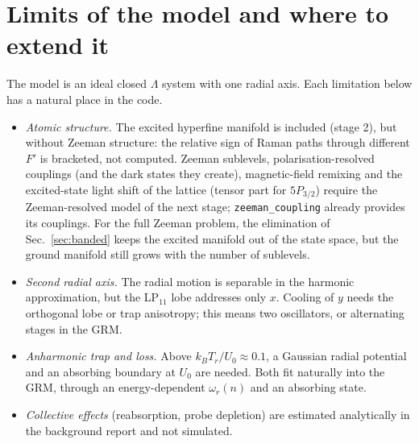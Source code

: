 \documentclass[11pt,a4paper]{article}
\newcommand{\code}[1]{\texttt{#1}}
\begin{document}
\section{Limits of the model and where to extend it}
The model is an ideal closed $\Lambda$ system with one radial axis. Each limitation below has a natural place in the code.
\begin{itemize}
\item \emph{Atomic structure.} The excited hyperfine manifold is included (stage 2), but without Zeeman structure: the relative sign of Raman paths through different $F'$ is bracketed, not computed. Zeeman sublevels, polarisation-resolved couplings (and the dark states they create), magnetic-field remixing and the excited-state light shift of the lattice (tensor part for $5P_{3/2}$) require the Zeeman-resolved model of the next stage; \code{zeeman\_coupling} already provides its couplings. For the full Zeeman problem, the elimination of Sec.~\ref{sec:banded} keeps the excited manifold out of the state space, but the ground manifold still grows with the number of sublevels.
\item \emph{Second radial axis.} The radial motion is separable in the harmonic approximation, but the LP$_{11}$ lobe addresses only $x$. Cooling of $y$ needs the orthogonal lobe or trap anisotropy; this means two oscillators, or alternating stages in the GRM.
\item \emph{Anharmonic trap and loss.} Above $k_BT_r/U_0\approx0.1$, a Gaussian radial potential and an absorbing boundary at $U_0$ are needed. Both fit naturally into the GRM, through an energy-dependent $\omega_r(n)$ and an absorbing state.
\item \emph{Collective effects} (reabsorption, probe depletion) are estimated analytically in the background report and not simulated.
\end{itemize}



\end{document}
